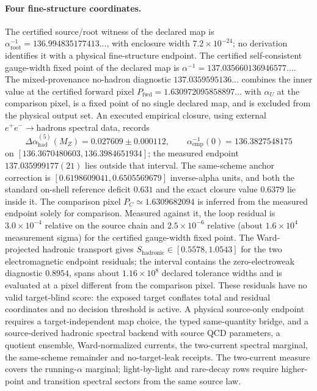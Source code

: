 \paragraph{Four fine-structure coordinates.}
The certified source/root witness of the declared map is
\(\alpha_{\mathrm{root}}^{-1}=136.994835177413\ldots\), with enclosure width
\(7.2\times10^{-24}\); no derivation identifies it with a physical
fine-structure endpoint. The certified self-consistent gauge-width fixed point
of the declared map is \(\alpha^{-1}=137.035660136946577\ldots\). The
mixed-provenance no-hadron diagnostic \(137.0359595136\ldots\) combines the
inner value at the certified forward pixel
\(P_{\mathrm{fwd}}=1.630972095858897\ldots\) with \(\alpha_U\) at the comparison
pixel, is a fixed point of no single declared map, and is excluded from the
physical output set. An executed empirical closure, using external
\(e^+e^-\to\mathrm{hadrons}\) spectral data, records
\[
\Delta\alpha_{\mathrm{had}}^{(5)}(M_Z)=0.027609\pm0.000112,
\qquad
\alpha_{\mathrm{emp}}^{-1}(0)=136.3827548175
\]
on \([136.3670480603,\allowbreak 136.3984651934]\); the measured endpoint
\(137.035999177(21)\) lies outside that interval. The same-scheme anchor
correction is \([0.6198609041,\allowbreak 0.6505569679]\) inverse-alpha units,
and both the standard on-shell reference deficit \(0.631\) and the exact
closure value \(0.6379\) lie inside it. The comparison pixel
\(P_C\simeq1.6309682094\) is inferred from the measured endpoint solely for
comparison. Measured against it, the loop residual is \(3.0\times10^{-4}\)
relative on the source chain and \(2.5\times10^{-6}\) relative (about
\(1.6\times10^{4}\) measurement sigma) for the certified gauge-width fixed
point. The Ward-projected hadronic transport gives
\(S_{\mathrm{hadronic}}\in[0.5578,1.0543]\) for the two electromagnetic
endpoint residuals; the interval contains the zero-electroweak diagnostic
\(0.8954\), spans about \(1.16\times10^8\) declared tolerance widths and is
evaluated at a pixel different from the comparison pixel. These residuals
have no valid target-blind score: the exposed target conflates total and
residual coordinates and no decision threshold is active. A physical
source-only endpoint requires a target-independent map choice, the typed
same-quantity bridge, and a source-derived hadronic spectral backend with
source QCD parameters, a quotient ensemble, Ward-normalized currents, the
two-current spectral marginal, the same-scheme remainder and no-target-leak
receipts. The two-current measure covers the running-\(\alpha\) marginal;
light-by-light and rare-decay rows require higher-point and transition
spectral sectors from the same source law.

